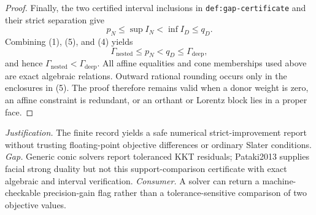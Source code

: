 \documentclass{article}
\begin{document}
\begin{proof}
Finally, the two certified interval inclusions in
\texttt{def:gap-certificate} and their strict separation give
\[
 p_N\leq\sup I_N<\inf I_D\leq q_D. \tag{5}
\]
Combining (1), (5), and (4) yields
\[
 \Gamma_{\mathrm{nested}}
 \leq p_N<q_D
 \leq\Gamma_{\mathrm{deep}},
\]
and hence
\(\Gamma_{\mathrm{nested}}<\Gamma_{\mathrm{deep}}\).
All affine equalities and cone memberships used above are exact algebraic
relations.  Outward rational rounding occurs only in the enclosures in (5).
The proof therefore remains valid when a donor weight is zero, an affine
constraint is redundant, or an orthant or Lorentz block lies in a proper
face.
\end{proof}
\par\smallskip\noindent \textit{Justification.} The finite record yields a safe numerical strict-improvement report without trusting floating-point objective differences or ordinary Slater conditions. \textit{Gap.} Generic conic solvers report toleranced KKT residuals; Pataki2013 supplies facial strong duality but not this support-comparison certificate with exact algebraic and interval verification. \textit{Consumer.} A solver can return a machine-checkable precision-gain flag rather than a tolerance-sensitive comparison of two objective values.
\end{document}
